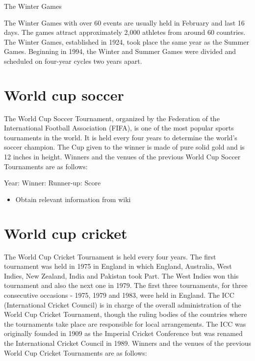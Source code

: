 \documentclass[
  openany]{book}
\providecommand{\tightlist}{%
  \setlength{\itemsep}{0pt}\setlength{\parskip}{0pt}}
\begin{document}
The Winter Games

The Winter Games with over 60 events are usually held in February and last 16 days. The games attract approximately 2,000 athletes from around 60 countries. The Winter Games, established in 1924, took place the same year as the Summer Games. Beginning in 1994, the Winter and Summer Games were divided and scheduled on four-year cycles two years apart.

\hypertarget{world-cup-soccer}{%
\section{World cup soccer}\label{world-cup-soccer}}

The World Cup Soccer Tournament, organized by the Federation of the International Football Association (FIFA), is one of the most popular sports tournaments in the world. It is held every four years to determine the world's soccer champion. The Cup given to the winner is made of pure solid gold and is 12 inches in height. Winners and the venues of the previous World Cup Soccer Tournaments are as follows:

Year: Winner: Runner-up: Score

\begin{itemize}
\tightlist
\item
  Obtain relevant information from wiki
\end{itemize}

\hypertarget{world-cup-cricket}{%
\section{World cup cricket}\label{world-cup-cricket}}

The World Cup Cricket Tournament is held every four years. The first tournament was held in 1975 in England in which England, Australia, West Indies, New Zealand, India and Pakistan took Part. The West Indies won this tournament and also the next one in 1979. The first three tournaments, for three consecutive occasions - 1975, 1979 and 1983, were held in England. The ICC (International Cricket Council) is in charge of the overall administration of the World Cup Cricket Tournament, though the ruling bodies of the countries where the tournaments take place are responsible for local arrangements. The ICC was originally founded in 1909 as the Imperial Cricket Conference but was renamed the International Cricket Council in 1989. Winners and the venues of the previous World Cup Cricket Tournaments are as follows:
\end{document}
